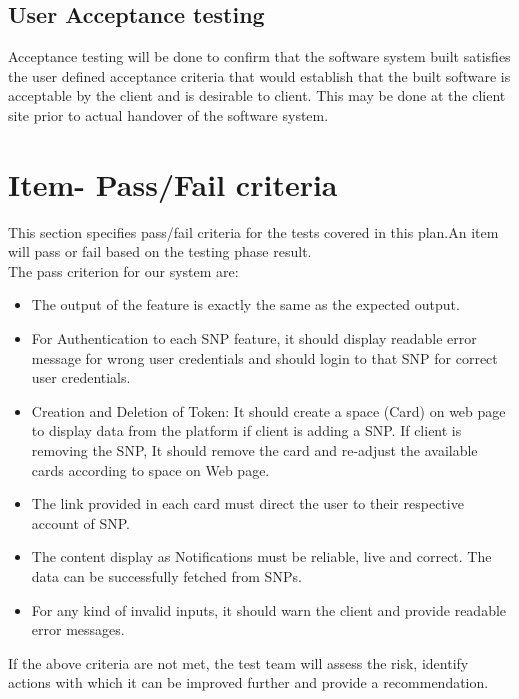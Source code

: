 \documentclass[12pt]{article}
\begin{document}
    \subsection{User Acceptance testing}
    Acceptance testing will be done to confirm that the software system built satisfies the user defined acceptance criteria that would establish that the built software is acceptable by the client and is desirable to client. This may be done at the client site prior to actual handover of the software system.
    
    \section{Item- Pass/Fail criteria}
    This section specifies pass/fail criteria for the tests covered in this plan.An item will pass or fail based on the testing phase result.\\
    The pass criterion for our system are:
    \begin{itemize}
        \item The output of the feature is exactly the same as the expected output.
        
        \item For Authentication to each SNP feature, it should display readable error message for wrong user credentials and should login to that SNP for correct user credentials.
        
        \item Creation and Deletion of Token: It should create a space (Card) on web page to display data from the platform if client is adding a SNP. If client is removing the SNP, It should remove the card and re-adjust the available cards according to space on Web page.
        
        \item The link provided in each card must direct the user to their respective account of SNP.
        
        
        \item The content display as Notifications must be reliable, live and correct. The data can be successfully fetched from SNPs.
        
        \item For any kind of invalid inputs, it should warn the client and provide readable error messages.
    
    \end{itemize}
    If the above criteria are not met, the test team will assess the risk, identify actions with which it can be improved further and provide a recommendation.
    
\end{document}
